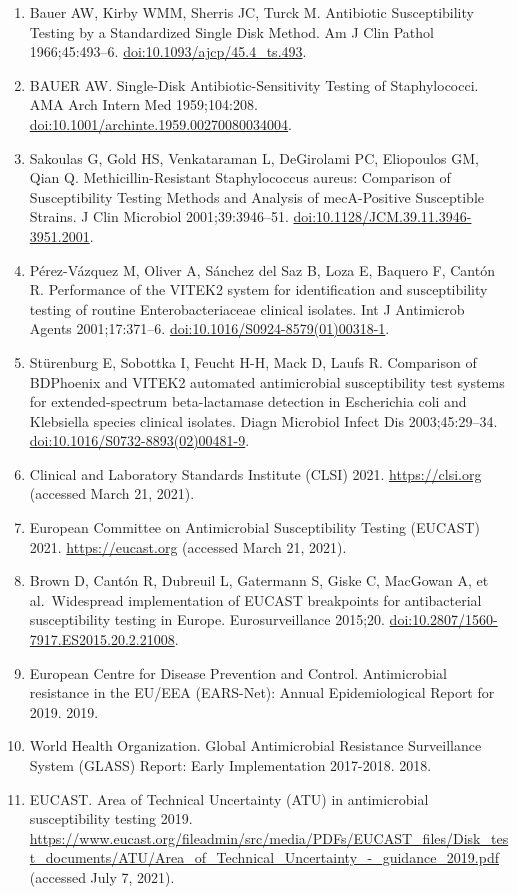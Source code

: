 \documentclass[
]{book}
\begin{document}
\begin{enumerate}
\item
  Bauer AW, Kirby WMM, Sherris JC, Turck M. Antibiotic Susceptibility Testing by a Standardized Single Disk Method. Am J Clin Pathol 1966;45:493--6. \url{doi:10.1093/ajcp/45.4_ts.493}.
\item
  BAUER AW. Single-Disk Antibiotic-Sensitivity Testing of Staphylococci. AMA Arch Intern Med 1959;104:208. \url{doi:10.1001/archinte.1959.00270080034004}.
\item
  Sakoulas G, Gold HS, Venkataraman L, DeGirolami PC, Eliopoulos GM, Qian Q. Methicillin-Resistant Staphylococcus aureus: Comparison of Susceptibility Testing Methods and Analysis of mecA-Positive Susceptible Strains. J Clin Microbiol 2001;39:3946--51. \url{doi:10.1128/JCM.39.11.3946-3951.2001}.
\item
  Pérez-Vázquez M, Oliver A, Sánchez del Saz B, Loza E, Baquero F, Cantón R. Performance of the VITEK2 system for identification and susceptibility testing of routine Enterobacteriaceae clinical isolates. Int J Antimicrob Agents 2001;17:371--6. \url{doi:10.1016/S0924-8579(01)00318-1}.
\item
  Stürenburg E, Sobottka I, Feucht H-H, Mack D, Laufs R. Comparison of BDPhoenix and VITEK2 automated antimicrobial susceptibility test systems for extended-spectrum beta-lactamase detection in Escherichia coli and Klebsiella species clinical isolates. Diagn Microbiol Infect Dis 2003;45:29--34. \url{doi:10.1016/S0732-8893(02)00481-9}.
\item
  Clinical and Laboratory Standards Institute (CLSI) 2021. \url{https://clsi.org} (accessed March 21, 2021).
\item
  European Committee on Antimicrobial Susceptibility Testing (EUCAST) 2021. \url{https://eucast.org} (accessed March 21, 2021).
\item
  Brown D, Cantón R, Dubreuil L, Gatermann S, Giske C, MacGowan A, et al.~Widespread implementation of EUCAST breakpoints for antibacterial susceptibility testing in Europe. Eurosurveillance 2015;20. \url{doi:10.2807/1560-7917.ES2015.20.2.21008}.
\item
  European Centre for Disease Prevention and Control. Antimicrobial resistance in the EU/EEA (EARS-Net): Annual Epidemiological Report for 2019. 2019.
\item
  World Health Organization. Global Antimicrobial Resistance Surveillance System (GLASS) Report: Early Implementation 2017-2018. 2018.
\item
  EUCAST. Area of Technical Uncertainty (ATU) in antimicrobial susceptibility testing 2019. \url{https://www.eucast.org/fileadmin/src/media/PDFs/EUCAST_files/Disk_test_documents/ATU/Area_of_Technical_Uncertainty_-_guidance_2019.pdf} (accessed July 7, 2021).

\end{enumerate}
\end{document}
